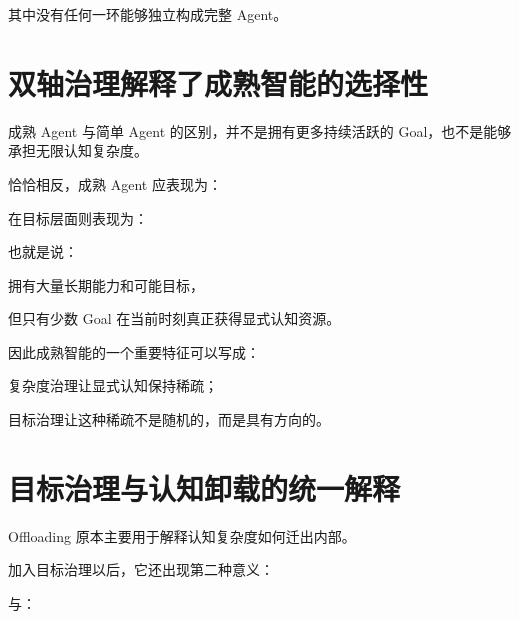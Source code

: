 其中没有任何一环能够独立构成完整 Agent。


\section{双轴治理解释了成熟智能的选择性}

成熟 Agent 与简单 Agent 的区别，并不是拥有更多持续活跃的 Goal，也不是能够承担无限认知复杂度。

恰恰相反，成熟 Agent 应表现为：

\begin{statementbox}
\centering
{}
\end{statementbox}

在目标层面则表现为：

\begin{statementbox}
\centering
{}
\end{statementbox}

也就是说：

拥有大量长期能力和可能目标，

但只有少数 Goal 在当前时刻真正获得显式认知资源。

因此成熟智能的一个重要特征可以写成：

\begin{statementbox}
\centering
{}
\end{statementbox}

复杂度治理让显式认知保持稀疏；

目标治理让这种稀疏不是随机的，而是具有方向的。


\section{目标治理与认知卸载的统一解释}

Offloading 原本主要用于解释认知复杂度如何迁出内部。

加入目标治理以后，它还出现第二种意义：

\begin{statementbox}
\centering
{}
\end{statementbox}

与：

\begin{statementbox}
\centering
{}
\end{statementbox}

